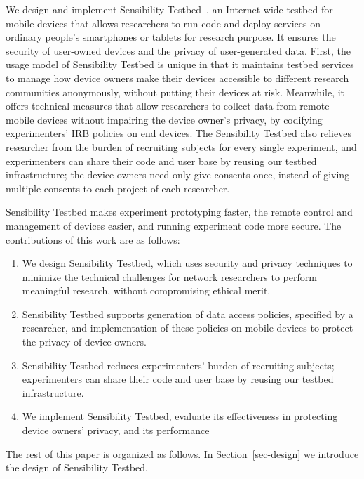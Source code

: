 We design and implement Sensibility Testbed~\cite{sensibility, 
zhuang2014sensibility}, an Internet-wide testbed for mobile devices that
allows researchers to run code and deploy services on ordinary
people's smartphones or tablets for research purpose. It ensures
the security of user-owned devices and the privacy of
user-generated data. First, the usage model of Sensibility Testbed is
unique in that it maintains testbed services to manage how device 
owners make their devices accessible to different research 
communities anonymously, without putting
their devices at risk. Meanwhile, it offers technical measures
that allow researchers to collect data from remote mobile
devices without impairing the device owner's privacy, by codifying 
experimenters' IRB policies on end devices. The
Sensibility Testbed also relieves researcher from the burden of
recruiting subjects for every single experiment, and 
experimenters can share their code and user base by reusing
our testbed infrastructure; the device
owners need only give consents once, instead of giving multiple
consents to each project of each researcher.

Sensibility Testbed makes experiment
prototyping faster, the remote control and management of devices
easier, and running experiment code more secure. The
contributions of this work are as follows:

\begin{enumerate}
\item We design Sensibility Testbed, which uses security and 
privacy techniques to minimize the technical challenges for 
network researchers to perform meaningful research, without 
compromising ethical merit.

\item Sensibility Testbed supports generation of data access 
policies, specified by a researcher, and implementation of 
these policies on mobile devices to protect the privacy of 
device owners.

\item Sensibility Testbed reduces experimenters' burden of 
recruiting subjects; experimenters can share their code and 
user base by reusing our testbed infrastructure.


\item We implement Sensibility Testbed, evaluate its effectiveness
in protecting device owners' privacy, and its performance 
\end{enumerate}

The rest of this paper is organized as follows. In Section~\ref{sec-design}
we introduce the design of Sensibility Testbed.